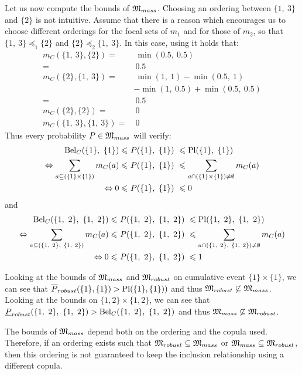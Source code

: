 \begin{example}
    Let us now compute the bounds of $\mathfrak{M}_{mass}$. Choosing an ordering between $\{1, ~3\}$ and $\{2\}$ is not intuitive. Assume that there is a reason which encourages us to choose different orderings for the focal sets of $m_1$ and for those of $m_2$, so that $\{1,~3\} \preceq_1 \{2\}$ and $\{2\} \preceq_2 \{1,~3\}$. In this case, using  it holds that:
    \begin{align*}
        m_C(\{1, ~3\}, \{2\}) =& ~\min(0.5, ~0.5)\\
        =& ~0.5\\
        m_C(\{2\}, \{1, ~3\}) =& ~\min(1, ~1) - \min(0.5, ~1)\\
        & - \min(1, ~0.5) + \min(0.5, ~0.5)\\
        =& ~0.5\\
        m_C(\{2\}, \{2\}) =& ~0\\
        m_C(\{1, ~3\}, \{1, ~3\}) =& ~0
    \end{align*}
    Thus every probability $P\in\mathfrak{M}_{mass}$ will verify:
    \begin{align*}
    	\mathrm{Bel}_C(\{1\},~ \{1\}) \leqslant ~&P(\{1\},~ \{1\})  ~\leqslant \mathrm{Pl}(\{1\},~ \{1\}) \\
    	\Leftrightarrow\sum_{a\subseteq(\{1\}\times \{1\})}m_C(a)\leqslant ~&P(\{1\},~ \{1\})  ~\leqslant\sum_{a\cap(\{1\}\times \{1\})\neq\emptyset}m_C(a)\\
        \Leftrightarrow 0 \leqslant ~&P(\{1\},~ \{1\}) ~ \leqslant 0
    \end{align*}
    and
     \begin{align*}
        \mathrm{Bel}_C(\{1, ~2\},~ \{1, ~2\}) \leqslant ~&P(\{1, ~2\},~ \{1, ~2\})  ~\leqslant \mathrm{Pl}(\{1, ~2\},~ \{1, ~2\}) \\
        \Leftrightarrow\sum_{a\subseteq(\{1, ~2\},~ \{1, ~2\})}m_C(a)\leqslant ~&P(\{1, ~2\},~ \{1, ~2\})  ~\leqslant\sum_{a\cap(\{1, ~2\},~ \{1, ~2\})\neq\emptyset}m_C(a)\\
        \Leftrightarrow 0 \leqslant ~&P(\{1, ~2\},~ \{1, ~2\})~ \leqslant 1
    \end{align*}
 
    Looking at the bounds of $\mathfrak{M}_{mass}$ and $\mathfrak{M}_{robust}$ on cumulative event $\{1\}\times\{1\}$, we can see that $\overline{P}_{robust}(\{1\}, \{1\}) > \mathrm{Pl}(\{1\}, \{1\}))$ and thus $\mathfrak{M}_{robust}\not\subseteq \mathfrak{M}_{mass}$.
    Looking at the bounds on $\{1,2\}\times\{1,2\}$, we can see that $\underline{P}_{robust}(\{1, ~2\},~ \{1, ~2\}) > \mathrm{Bel}_C(\{1, ~2\},~ \{1, ~2\})$ and thus $\mathfrak{M}_{mass}\not\subseteq \mathfrak{M}_{robust}$.
    
    \begin{remark}
        The bounds of $\mathfrak{M}_{mass}$ depend both on the ordering and the copula used. Therefore, if an ordering exists such that $\mathfrak{M}_{robust}\subseteq\mathfrak{M}_{mass}$ or $\mathfrak{M}_{mass}\subseteq\mathfrak{M}_{robust}$, then this ordering is not guaranteed to keep the inclusion relationship using a different copula.
    \end{remark}
\end{example}

